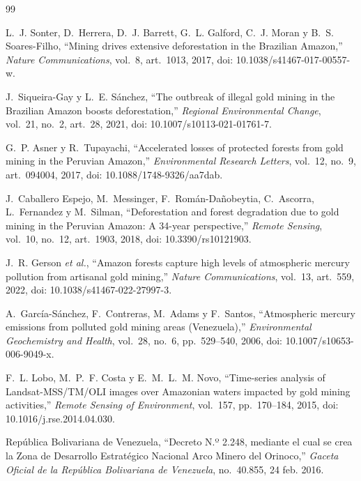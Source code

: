 \documentclass[conference]{IEEEtran}
\begin{document}
\begin{thebibliography}{99}

L.~J. Sonter, D.~Herrera, D.~J. Barrett, G.~L. Galford, C.~J. Moran y B.~S. Soares-Filho, ``Mining drives extensive deforestation in the Brazilian Amazon,'' \emph{Nature Communications}, vol.~8, art.~1013, 2017, doi: 10.1038/s41467-017-00557-w.

J.~Siqueira-Gay y L.~E. Sánchez, ``The outbreak of illegal gold mining in the Brazilian Amazon boosts deforestation,'' \emph{Regional Environmental Change}, vol.~21, no.~2, art.~28, 2021, doi: 10.1007/s10113-021-01761-7.

G.~P. Asner y R.~Tupayachi, ``Accelerated losses of protected forests from gold mining in the Peruvian Amazon,'' \emph{Environmental Research Letters}, vol.~12, no.~9, art.~094004, 2017, doi: 10.1088/1748-9326/aa7dab.

J.~Caballero Espejo, M.~Messinger, F.~Román-Dañobeytia, C.~Ascorra, L.~Fernandez y M.~Silman, ``Deforestation and forest degradation due to gold mining in the Peruvian Amazon: A 34-year perspective,'' \emph{Remote Sensing}, vol.~10, no.~12, art.~1903, 2018, doi: 10.3390/rs10121903.

J.~R. Gerson \emph{et al.}, ``Amazon forests capture high levels of atmospheric mercury pollution from artisanal gold mining,'' \emph{Nature Communications}, vol.~13, art.~559, 2022, doi: 10.1038/s41467-022-27997-3.

A.~García-Sánchez, F.~Contreras, M.~Adams y F.~Santos, ``Atmospheric mercury emissions from polluted gold mining areas (Venezuela),'' \emph{Environmental Geochemistry and Health}, vol.~28, no.~6, pp.~529--540, 2006, doi: 10.1007/s10653-006-9049-x.

F.~L. Lobo, M.~P.~F. Costa y E.~M.~L.~M. Novo, ``Time-series analysis of Landsat-MSS/TM/OLI images over Amazonian waters impacted by gold mining activities,'' \emph{Remote Sensing of Environment}, vol.~157, pp.~170--184, 2015, doi: 10.1016/j.rse.2014.04.030.

República Bolivariana de Venezuela, ``Decreto N.º 2.248, mediante el cual se crea la Zona de Desarrollo Estratégico Nacional Arco Minero del Orinoco,'' \emph{Gaceta Oficial de la República Bolivariana de Venezuela}, no.~40.855, 24 feb. 2016.


\end{thebibliography}
\end{document}
